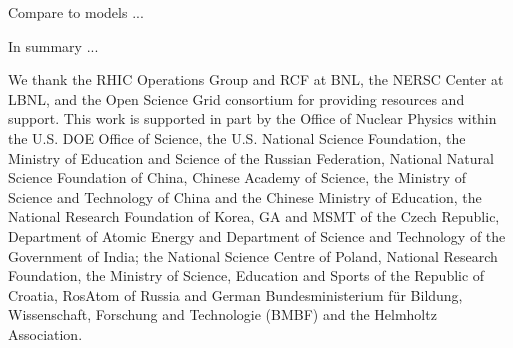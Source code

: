 \documentclass[%
 reprint,	
showpacs,
 amsmath,amssymb,
 aps,
 prc,
]{revtex4-1}
\begin{document}
Compare to models ...


In summary ...




We thank the RHIC Operations Group and RCF at BNL, the NERSC Center at LBNL, and the Open Science Grid consortium for providing resources and support. This work is supported in part by the Office of Nuclear Physics within the U.S. DOE Office of Science, the U.S. National Science Foundation, the Ministry of Education and Science of the Russian Federation, National Natural Science Foundation of China, Chinese Academy of Science, the Ministry of Science and Technology of China and the Chinese Ministry of Education, the National Research Foundation of Korea, GA and MSMT of the Czech Republic, Department of Atomic Energy and Department of Science and Technology of the Government of India; the National Science Centre of Poland, National Research Foundation, the Ministry of Science, Education and Sports of the Republic of Croatia, RosAtom of Russia and German Bundesministerium f{\"u}r Bildung, Wissenschaft, Forschung and Technologie (BMBF) and the Helmholtz Association.


\end{document}

